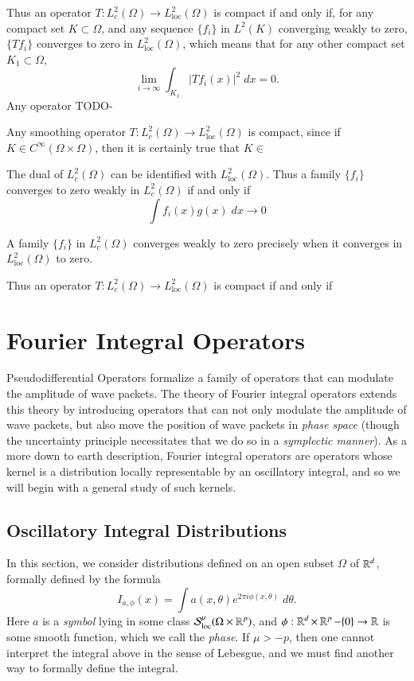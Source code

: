 Thus an operator $T: L^2_c(\Omega) \to L^2_{\text{loc}}(\Omega)$ is compact if and only if, for any compact set $K \subset \Omega$, and any sequence $\{ f_i \}$ in $L^2(K)$ converging weakly to zero, $\{ Tf_i \}$ converges to zero in $L^2_{\text{loc}}(\Omega)$, which means that for any other compact set $K_1 \subset \Omega$,
%
\[ \lim_{i \to \infty} \int_{K_1} |Tf_i(x)|^2\; dx = 0. \]
%
Any operator TODO-

Any smoothing operator $T: L^2_c(\Omega) \to L^2_{\text{loc}}(\Omega)$ is compact, since if $K \in C^\infty(\Omega \times \Omega)$, then it is certainly true that $K \in $

The dual of $L^2_c(\Omega)$ can be identified with $L^2_{\text{loc}}(\Omega)$. Thus a family $\{ f_i \}$ converges to zero weakly in $L^2_c(\Omega)$ if and only if
%
\[ \int f_i(x) g(x)\; dx \to 0 \]

A family $\{ f_i \}$ in $L^2_c(\Omega)$ converges weakly to zero precisely when it converges in $L^2_{\text{loc}}(\Omega)$ to zero.

Thus an operator $T: L^2_c(\Omega) \to L^2_{\text{loc}}(\Omega)$ is compact if and only if 









\chapter{Fourier Integral Operators}

Pseudodifferential Operators formalize a family of operators that can modulate the amplitude of wave packets. The theory of Fourier integral operators extends this theory by introducing operators that can not only modulate the amplitude of wave packets, but also move the position of wave packets in \emph{phase space} (though the uncertainty principle necessitates that we do so in a \emph{symplectic manner}). As a more down to earth description, Fourier integral operators are operators whose kernel is a distribution locally representable by an oscillatory integral, and so we will begin with a general study of such kernels.

\section{Oscillatory Integral Distributions}

In this section, we consider distributions defined on an open subset $\Omega$ of $\operatorname{\mathbb{R}}^d$, formally defined by the formula
%
\[ I_{a,\phi}(x) = \int a(x,\theta) e^{2 \pi i \phi(x,\theta)}\; d\theta. \]
%
Here $a$ is a \emph{symbol} lying in some class $\mathcal{S}^\mu_{\text{loc}}(\Omega \times \operatorname{\mathbb{R}}^p)$, and $\phi: \operatorname{\mathbb{R}}^d \times \operatorname{\mathbb{R}}^p - \{ 0 \} \to \operatorname{\mathbb{R}}$ is some smooth function, which we call the \emph{phase}. If $\mu > -p$, then one cannot interpret the integral above in the sense of Lebesgue, and we must find another way to formally define the integral.

